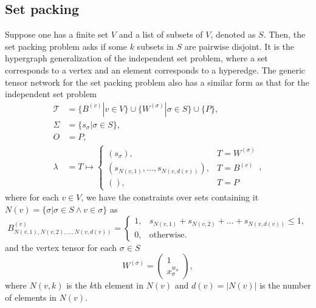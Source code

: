 \documentclass[review, onefignum, onetabnum]{siamart190516}
\begin{document}
\subsection{Set packing}
Suppose one has a finite set $V$ and a list of subsets of $V$, denoted as $S$. Then, the set packing problem asks if some $k$ subsets in $S$ are pairwise disjoint.
It is the hypergraph generalization of the independent set problem, where a set corresponds to a vertex and an element corresponds to a hyperedge.
The generic tensor network for the set packing problem also has a similar form as that for the independent set problem
\begin{equation}\label{eq:packtensornetwork}
\begin{split}
    \mathcal{T} &= \{B^{(v)} | v\in V\} \cup \{W^{(\sigma)} | \sigma \in S\} \cup \{P\},\\
    \Sigma &= \{s_\sigma | \sigma \in S\},\\
    O &= P,\\
    \lambda &= T \mapsto \begin{cases}
                    (s_\sigma), & T = W^{(\sigma)}\\
                    (s_{N(v, 1)}, \ldots, s_{N(v, d(v))}), & T = B^{(v)}\\
                    (), & T = P
                    \end{cases},
\end{split}
\end{equation}
where for each $v \in V$, we have the constraints over sets containing it $N(v) = \{\sigma| \sigma\in S \wedge v \in \sigma\}$ as
\begin{equation}
    B^{(v)}_{N(v, 1), N(v, 2),\ldots, N(v, d(v))} = \begin{cases}
        1, & s_{N(v, 1)}+ s_{N(v, 2)} + \ldots + s_{N(v, d(v))}\leq 1,\\
        0, & \text{otherwise}.
    \end{cases}
\end{equation}
and the vertex tensor for each $\sigma \in S$
\begin{equation}
    W^{(\sigma)} = \left(\begin{matrix}
        1\\
        x^{w_\sigma}_{\sigma}
    \end{matrix}\right),
\end{equation}
where $N(v, k)$ is the $k$th element in $N(v)$ and $d(v) = |N(v)|$ is the number of elements in $N(v)$.
\end{document}
